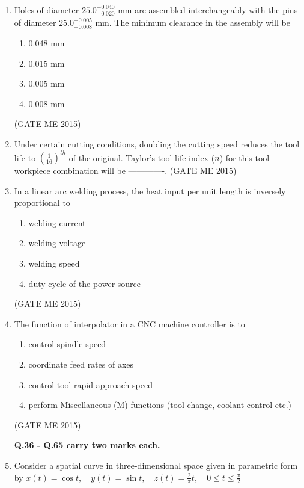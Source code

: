\documentclass[journal]{IEEEtran}
\begin{document}
\begin{enumerate}
\item Holes of diameter $ 25.0^{+0.040}_{+0.020} $ mm are assembled interchangeably with the pins of diameter $ 25.0^{+0.005}_{-0.008} $ mm. The minimum clearance in the assembly will be

\begin{enumerate}
    \item 0.048 mm
    \item 0.015 mm
    \item 0.005 mm
    \item 0.008 mm
\end{enumerate}
\hfill  (GATE ME 2015)

\item Under certain cutting conditions, doubling the cutting speed reduces the tool life to $ \left( \frac{1}{16} \right)^{th} $ of the original. Taylor’s tool life index ($ n $) for this tool-workpiece combination will be -------------.
\hfill  (GATE ME 2015)

\item In a linear arc welding process, the heat input per unit length is inversely proportional to

\begin{enumerate}
    \item welding current
    \item welding voltage
    \item welding speed
    \item duty cycle of the power source
\end{enumerate}
\hfill  (GATE ME 2015)

\item The function of interpolator in a CNC machine controller is to

\begin{enumerate}
    \item control spindle speed
    \item coordinate feed rates of axes
    \item control tool rapid approach speed
    \item perform Miscellaneous (M) functions (tool change, coolant control etc.)
\end{enumerate}
\hfill  (GATE ME 2015)

\textbf{Q.36 - Q.65 carry two marks each.}

\item Consider a spatial curve in three-dimensional space given in parametric form by
$x(t) = \cos t, \quad y(t) = \sin t, \quad z(t) = \frac{2}{\pi} t, \quad 0 \leq t \leq \frac{\pi}{2}$


\end{enumerate}
\end{document}
